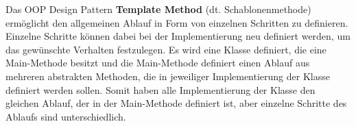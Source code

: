Das OOP Design Pattern \textbf{Template Method} (dt. Schablonenmethode) ermöglicht den allgemeinen Ablauf in Form von einzelnen Schritten zu definieren.
Einzelne Schritte können dabei bei der Implementierung neu definiert werden, um das gewünschte Verhalten festzulegen.
Es wird eine Klasse definiert, die eine Main-Methode besitzt und die Main-Methode 
definiert einen Ablauf aus mehreren abstrakten Methoden, die in jeweiliger 
Implementierung der Klasse definiert werden sollen. Somit haben alle Implementierung 
der Klasse den gleichen Ablauf, der in der Main-Methode definiert ist, 
aber einzelne Schritte des Ablaufs sind unterschiedlich.